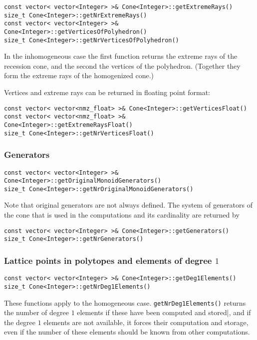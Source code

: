 \begin{small}
\begin{Verbatim}
const vector< vector<Integer> >& Cone<Integer>::getExtremeRays()
size_t Cone<Integer>::getNrExtremeRays()
const vector< vector<Integer> >& Cone<Integer>::getVerticesOfPolyhedron()
size_t Cone<Integer>::getNrVerticesOfPolyhedron()
\end{Verbatim}

In the inhomogeneous case the first function returns the extreme rays of the recession cone, and the second the vertices of the polyhedron. (Together they form the extreme rays of the homogenized cone.)

Vertices and extreme rays can be returned in floating point format:
\begin{Verbatim}
const vector< vector<nmz_float> >& Cone<Integer>::getVerticesFloat()
const vector< vector<nmz_float> >& Cone<Integer>::getExtremeRaysFloat()
size_t Cone<Integer>::getNrVerticesFloat()
\end{Verbatim}

\subsubsection{Generators}

\begin{Verbatim}
const vector< vector<Integer> >& Cone<Integer>::getOriginalMonoidGenerators()
size_t Cone<Integer>::getNrOriginalMonoidGenerators()
\end{Verbatim}
Note that original generators are not always defined. The system of generators of the cone that is used in the computations and its cardinality are returned by
\begin{Verbatim}
const vector< vector<Integer> >& Cone<Integer>::getGenerators()
size_t Cone<Integer>::getNrGenerators()
\end{Verbatim}

\subsubsection{Lattice points in polytopes and elements of degree $1$}

\begin{Verbatim}
const vector< vector<Integer> >& Cone<Integer>::getDeg1Elements()
size_t Cone<Integer>::getNrDeg1Elements()
\end{Verbatim}
These functions apply to the homogeneous case. \verb|getNrDeg1Elements()| returns the number of degree $1$ elements if these have been computed and stored|, and if the degree $1$ elements are not available, it forces their computation and storage, even if the number of these elements should be known from other computations.


\end{small}
